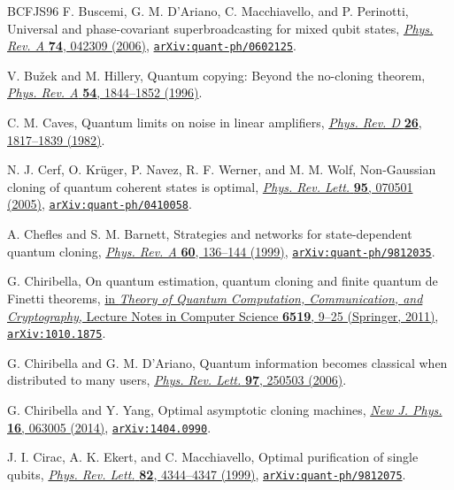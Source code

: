 \documentclass[11pt]{article}
\theoremstyle{remark}
\theoremstyle{plain}
\newcommand{\doi}[2]{\href{https://doi.org/#1}{#2}}
\newcommand{\arxiv}[1]{\href{https://arxiv.org/abs/#1}{\texttt{arXiv:#1}}}
\begin{document}
\begin{thebibliography}{BCFJS96}
F. Buscemi, G. M. D'Ariano, C. Macchiavello, and P. Perinotti,
Universal and phase-covariant superbroadcasting for mixed qubit states,
\doi{10.1103/PhysRevA.74.042309}{\emph{Phys. Rev. A} \textbf{74}, 042309 (2006)},
\arxiv{quant-ph/0602125}.

V. Bu\v{z}ek and M. Hillery,
Quantum copying: Beyond the no-cloning theorem,
\doi{10.1103/PhysRevA.54.1844}{\emph{Phys. Rev. A} \textbf{54}, 1844--1852 (1996)}.

C. M. Caves,
Quantum limits on noise in linear amplifiers,
\doi{10.1103/PhysRevD.26.1817}{\emph{Phys. Rev. D} \textbf{26}, 1817--1839 (1982)}.

N. J. Cerf, O. Kr\"uger, P. Navez, R. F. Werner, and M. M. Wolf,
Non-Gaussian cloning of quantum coherent states is optimal,
\doi{10.1103/PhysRevLett.95.070501}{\emph{Phys. Rev. Lett.} \textbf{95}, 070501 (2005)},
\arxiv{quant-ph/0410058}.

A. Chefles and S. M. Barnett,
Strategies and networks for state-dependent quantum cloning,
\doi{10.1103/PhysRevA.60.136}{\emph{Phys. Rev. A} \textbf{60}, 136--144 (1999)},
\arxiv{quant-ph/9812035}.

G. Chiribella,
On quantum estimation, quantum cloning and finite quantum de Finetti theorems,
\doi{10.1007/978-3-642-18073-6_2}{in \emph{Theory of Quantum Computation,
Communication, and Cryptography}, Lecture Notes in Computer Science
\textbf{6519}, 9--25 (Springer, 2011)},
\arxiv{1010.1875}.

G. Chiribella and G. M. D'Ariano,
Quantum information becomes classical when distributed to many users,
\doi{10.1103/PhysRevLett.97.250503}{\emph{Phys. Rev. Lett.} \textbf{97}, 250503 (2006)}.

G. Chiribella and Y. Yang,
Optimal asymptotic cloning machines,
\doi{10.1088/1367-2630/16/6/063005}{\emph{New J. Phys.} \textbf{16}, 063005 (2014)},
\arxiv{1404.0990}.

J. I. Cirac, A. K. Ekert, and C. Macchiavello,
Optimal purification of single qubits,
\doi{10.1103/PhysRevLett.82.4344}{\emph{Phys. Rev. Lett.} \textbf{82}, 4344--4347 (1999)},
\arxiv{quant-ph/9812075}.


\end{thebibliography}
\end{document}
